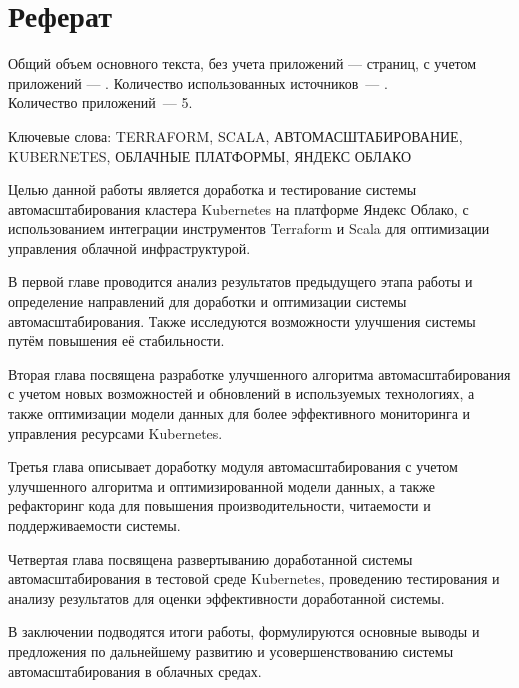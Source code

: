 \chapter*{Реферат}
\thispagestyle{plain}

Общий объем основного текста, без учета приложений ---
\pageref{end_of_main_text} страниц, с учетом приложений ---
\pageref{end_of_document}. Количество использованных источников~---
\thetotalcitations.\\
Количество приложений~--- 5.

Ключевые слова:
\noindent
\uppercase{
terraform, scala, автомасштабирование, kubernetes, облачные платформы, Яндекс
Облако
}

Целью данной работы является доработка и тестирование системы
автомасштабирования кластера Kubernetes на платформе Яндекс Облако, с
использованием интеграции инструментов Terraform и Scala для оптимизации
управления облачной инфраструктурой.

В первой главе проводится анализ результатов предыдущего этапа работы и
определение направлений для доработки и оптимизации системы автомасштабирования.
Также исследуются возможности улучшения системы путём повышения её стабильности.

Вторая глава посвящена разработке улучшенного алгоритма автомасштабирования с
учетом новых возможностей и обновлений в используемых технологиях, а также
оптимизации модели данных для более эффективного мониторинга и управления
ресурсами Kubernetes.

Третья глава описывает доработку модуля автомасштабирования с учетом улучшенного
алгоритма и оптимизированной модели данных, а также рефакторинг кода для
повышения производительности, читаемости и поддерживаемости системы.

Четвертая глава посвящена развертыванию доработанной системы автомасштабирования
в тестовой среде Kubernetes, проведению тестирования и анализу результатов для
оценки эффективности доработанной системы.

В заключении подводятся итоги работы, формулируются основные выводы и
предложения по дальнейшему развитию и усовершенствованию системы
автомасштабирования в облачных средах.
